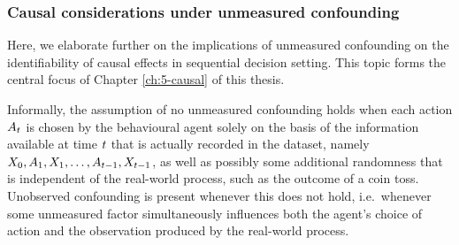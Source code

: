 \subsubsection{Causal considerations under unmeasured confounding}\label{subsec:unmeasured-confounding}
Here, we elaborate further on the implications of unmeasured confounding on the identifiability of causal effects in sequential decision setting. This topic forms the central focus of Chapter \ref{ch:5-causal} of this thesis.

Informally, the assumption of no unmeasured confounding holds when each action $A_t$ is chosen by the behavioural agent solely on the basis of the information available at time $t$ that is actually recorded in the dataset, namely $X_{0}, A_1, X_1, \ldots, A_{t-1}, X_{t-1}$, as well as possibly some additional randomness that is independent of the real-world process, such as the outcome of a coin toss. Unobserved confounding is present whenever this does not hold, i.e.\ whenever some unmeasured factor simultaneously influences both the agent's choice of action and the observation produced by the real-world process.


